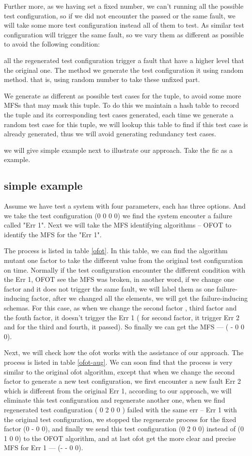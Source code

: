 \documentclass{sig-alternate}
\begin{document}
Further more, as we having set a fixed number, we can't running all the possible test configuration, so if we did not encounter the passed or the same fault, we will take some more test configuration instead all of them to test. As similar test configuration will trigger the same fault, so we vary them as different as possible to avoid the following condition:

all the regenerated test configuration trigger a fault that have a higher level that the original one.
The method we generate the test configuration it using random method. that is, using random number to take these unfixed part.

We generate as different as possible test cases for the tuple, to avoid some more MFSs that may mask this tuple. To do this we maintain a hash table to record the tuple and its corresponding test cases generated, each time we generate a random test case for this tuple, we will lookup this table to find if this test case is already generated, thus we will avoid generating redundancy test cases.

we will give simple example next to illustrate our approach. Take the fic as a example.

\subsection{simple example}
Assume we have test a system with four parameters, each has three options. And we take the test configuration (0 0 0 0) we find the system encouter a failure called "Err 1". Next we will take the MFS identifying algorithms -- OFOT to identify the MFS for the "Err 1".

The process is listed in table \ref{ofot}. In this table, we can find the algorithm mutant one factor to take the different value from the original test configuration on time. Normally if the test configuration encounter the different condition with the Err 1, OFOT see the MFS was broken, in another word, if we change one factor and it does not trigger the same fault, we will label them as one failure-inducing factor, after we changed all the elements, we will get the failure-inducing schemas. For this case, as when we change the second factor , third factor and the fouth factor, it doesn't trigger the Err 1 ( for second factor, it trigger Err 2 and for the third and fourth, it passed). So finally we can get the MFS --- ( - 0 0 0).

Next, we will check how the ofot works with the assistance of our approach. The process is listed in table \ref{ofot-aug}. We can soon find that the process is very similar to the original ofot algorithm, except that when we change the second factor to generate a new test configuration, we first encounter a new fault Err 2 which is different from the original Err 1, according to our approach, we will eliminate this test configuration and regenerate another one, when we find regenerated test configuration ( 0 2 0 0 ) failed with the same err -- Err 1 with the original test configuration, we stopped the regenerate process for the fixed factor (0 - 0 0), and finally we send this test configuration (0 2 0 0) instead of (0 1 0 0) to the OFOT algorithm, and at last ofot get the more clear and precise MFS for Err 1 --- (- - 0 0).
\end{document}
